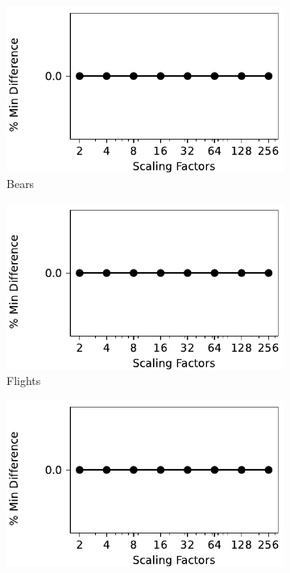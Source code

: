 \begin{figure}[!ht]
    \centering 
    \centering
\begin{subfigure}{0.32\textwidth}
    \includegraphics[width=\textwidth]{figures/plot/min/min_diff_beers.pdf}
    \caption{Bears}
    \label{exp:min_bears}
\end{subfigure}
\hfill
\begin{subfigure}{0.32\textwidth}
    \includegraphics[width=\textwidth]{figures/plot/min/min_diff_flights.pdf}
    \caption{Flights}
    \label{exp:min_flights}
\end{subfigure}
\hfill
\begin{subfigure}{0.32\textwidth}
    \includegraphics[width=\textwidth]{figures/plot/min/min_diff_hospital.pdf}

\end{subfigure}
\end{figure}
